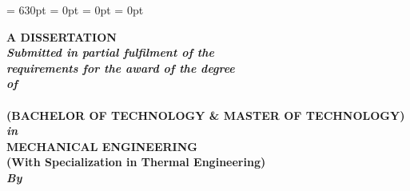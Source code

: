 \begin{titlepage}
\renewcommand{\baselinestretch}{1.5}
  \setlength{\parindent}{0pt}
\textheight = 630pt \topmargin=0pt \voffset=1cm \headheight = 0pt
\marginparwidth= 0pt \headsep = 0pt
\pagestyle{empty}

\begin{center}
\renewcommand{\baselinestretch}{1.2}
\thispagestyle{empty}
\vspace{-10pt}

{\Large \bfseries {\ttitle}\par}\vspace{0.4cm} %

\vspace{0.8cm}
\begingroup
    \fontsize{12pt}{12pt} \selectfont
    \bfseries
\vspace{0.5cm}    
{\large\textbf{A DISSERTATION}} \\
\vspace{0.5cm}
{
{\emph{\emph{\textbf{\textit{Submitted in partial fulfilment of
the \\ requirements for
the award of the degree \\\vspace{0.35cm}
of}}}}\\\vspace{0.3cm}
{\normalsize\textbf{\degreename}}}\\\vspace{0.1cm}
{\normalsize\textbf{(BACHELOR OF TECHNOLOGY \& MASTER OF TECHNOLOGY)}}\\\vspace{0.5cm}
\emph{\emph{\textbf{\textit{in}}}} \\\vspace{0.5cm}
{\normalsize\textbf{MECHANICAL ENGINEERING}}}\\
{\small\textbf {\textsf{(With Specialization in Thermal Engineering)}}} \\
\vspace{1cm}
{\emph {\emph{\textbf{\textit{By}}}}} \\\vspace{0.5cm}
{\normalsize\textbf{\authorname}}\\
\endgroup


\end{center}
\end{titlepage}
